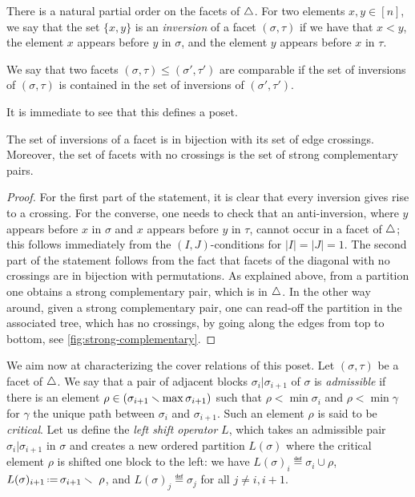 There is a natural partial order on the facets of $\triangle$. 
For two elements $x,y \in [n]$, we say that the set $\{x,y\}$ is an \emph{inversion} of a facet $(\sigma,\tau)$ if we have that $x<y$, the element $x$ appears before $y$ in $\sigma$, and the element $y$ appears before $x$ in $\tau$. 

\begin{definition}
    We say that two facets $(\sigma,\tau) \leq (\sigma',\tau')$ are comparable if the set of inversions of $(\sigma,\tau)$ is contained in the set of inversions of $(\sigma',\tau')$.
\end{definition}

It is immediate to see that this defines a poset.

\begin{proposition}
\label{p:crossings}
The set of inversions of a facet is in bijection with its set of edge crossings. 
Moreover, the set of facets with no crossings is the set of strong complementary pairs. 
\end{proposition}

\begin{proof}
    For the first part of the statement, it is clear that every inversion gives rise to a crossing. 
    For the converse, one needs to check that an anti-inversion, where $y$ appears before $x$ in $\sigma$ and $x$ appears before $y$ in $\tau$, cannot occur in a facet of $\triangle$; this follows immediately from the $(I,J)$-conditions for $|I|=|J|=1$. 
    The second part of the statement follows from the fact that facets of the diagonal with no crossings are in bijection with permutations.
    As explained above, from a partition one obtains a strong complementary pair, which is in $\triangle$. 
    In the other way around, given a strong complementary pair, one can read-off the partition in the associated tree, which has no crossings, by going along the edges from top to bottom, see \cref{fig:strong-complementary}.
\end{proof}


We aim now at characterizing the cover relations of this poset. 
Let $(\sigma,\tau)$ be a facet of $\triangle$.
We say that a pair of adjacent blocks $\sigma_i | \sigma_{i+1}$ of $\sigma$ is \emph{admissible} if there is an element $\rho \in (\sigma_{i+1} \smallsetminus \max\sigma_{i+1})$ such that $\rho < \min \sigma_{i}$ and $\rho < \min \gamma$ for $\gamma$ the unique path between $\sigma_i$ and $\sigma_{i+1}$. 
Such an element $\rho$ is said to be \emph{critical}. 
Let us define the \emph{left shift operator} $L$, which takes an admissible pair $\sigma_i | \sigma_{i+1}$ in $\sigma$ and creates a new ordered partition $L(\sigma)$ where the critical element $\rho$ is shifted one block to the left: we have $L(\sigma)_i  \eqdef  \sigma_i \cup \rho$, $L(\sigma)_{i+1}  \eqdef  \sigma_{i+1} \ssm \ \rho$, and $L(\sigma)_{j} \eqdef \sigma_j$ for all $j\neq i, i+1$. 

